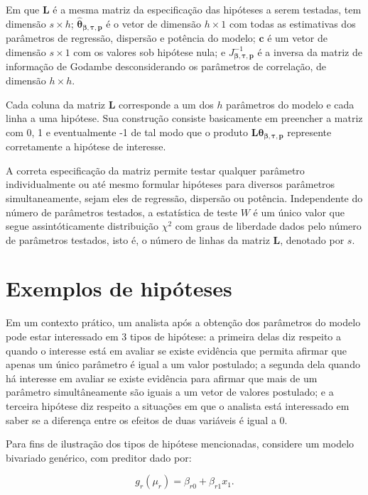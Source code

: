 \noindent Em que $\boldsymbol{L}$ é a mesma matriz da especificação das hipóteses a serem testadas, tem dimensão $s \times h$; $\boldsymbol{\hat\theta_{\beta,\tau,p}}$ é o vetor de dimensão $h \times 1$ com todas as estimativas dos parâmetros de regressão, dispersão e potência do modelo; $\boldsymbol{c}$ é um vetor de dimensão $s \times 1$ com os valores sob hipótese nula; e $J_{\boldsymbol{{\beta,\tau,p}}}^{-1}$ é a inversa da matriz de informação de Godambe desconsiderando os parâmetros de correlação, de dimensão $h \times h$.

Cada coluna da matriz $\boldsymbol{L}$ corresponde a um dos $h$ parâmetros do modelo e cada linha a uma hipótese. Sua construção consiste basicamente em preencher a matriz com 0, 1 e eventualmente -1 de tal modo que o produto $\boldsymbol{L}\boldsymbol{\theta_{\beta,\tau,p}}$ represente corretamente a hipótese de interesse.

A correta especificação da matriz permite testar qualquer parâmetro individualmente ou até mesmo formular hipóteses para diversos parâmetros simultaneamente, sejam eles de regressão, dispersão ou potência. Independente do número de parâmetros testados, a estatística de teste $W$ é um único valor que segue assintóticamente distribuição $\chi^2$ com graus de liberdade dados pelo número de parâmetros testados, isto é, o número de linhas da matriz $\boldsymbol{L}$, denotado por $s$.

\section{Exemplos de hipóteses}

Em um contexto prático, um analista após a obtenção dos parâmetros do modelo pode estar interessado em 3 tipos de hipótese: a primeira delas diz respeito a quando o interesse está em avaliar se existe evidência que permita afirmar que apenas um único parâmetro é igual a um valor postulado; a segunda dela quando há interesse em avaliar se existe evidência para afirmar que mais de um parâmetro simultâneamente são iguais a um vetor de valores postulado; e a terceira hipótese diz respeito a situações em que o analista está interessado em saber se a diferença entre os efeitos de duas variáveis é igual a 0.

Para fins de ilustração dos tipos de hipótese mencionadas, considere um modelo bivariado genérico, com preditor dado por:

\begin{equation}
g_r(\mu_r) = \beta_{r0} + \beta_{r1} x_1.
\end{equation}

